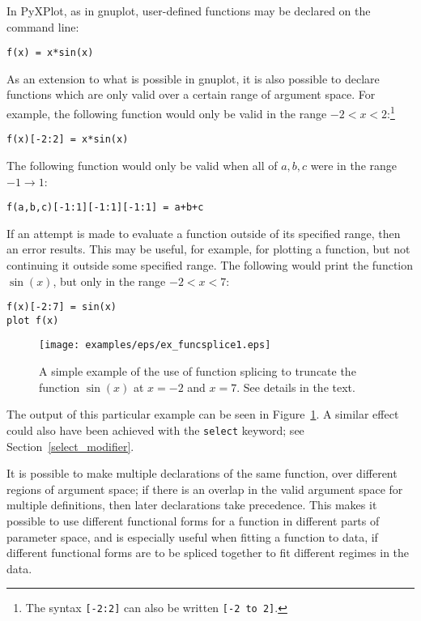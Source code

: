 \documentclass[a4paper,onecolumn,11pt]{book}
\begin{document}
In PyXPlot, as in gnuplot, user-defined functions may be declared on the
command line:

\begin{verbatim}
f(x) = x*sin(x)
\end{verbatim}

\noindent As an extension to what is possible in gnuplot, it is also possible
to declare functions which are only valid over a certain range of argument
space. For example, the following function would only be valid in the range
$-2<x<2$:\footnote{The syntax \texttt{[-2:2]} can also be written \texttt{[-2
to 2]}.}

\begin{verbatim}
f(x)[-2:2] = x*sin(x)
\end{verbatim}

\noindent The following function would only be valid when all of ${a,b,c}$ were
in the range $-1 \to 1$:

\begin{verbatim}
f(a,b,c)[-1:1][-1:1][-1:1] = a+b+c
\end{verbatim}

If an attempt is made to evaluate a function outside of its specified range,
then an error results. This may be useful, for example, for plotting a
function, but not continuing it outside some specified range. The following
would print the function $\sin(x)$, but only in the range $-2<x<7$:

\begin{verbatim}
f(x)[-2:7] = sin(x)
plot f(x)
\end{verbatim}

\begin{figure}
\begin{center}
\texttt{[image: examples/eps/ex\_funcsplice1.eps]}
\end{center}
\caption{A simple example of the use of function splicing to truncate the function $\sin(x)$ at $x=-2$ and $x=7$. See details in the text.}
\label{fig:ex_funcsplice1}
\end{figure}

\label{splice} \noindent The output of this particular example can be seen in
Figure~\ref{fig:ex_funcsplice1}. A similar effect could also have been achieved
with the \texttt{select} keyword; see Section~\ref{select_modifier}.

It is possible to make multiple declarations of the same function, over
different regions of argument space; if there is an overlap in the valid
argument space for multiple definitions, then later declarations take
precedence. This makes it possible to use different functional forms for a
function in different parts of parameter space, and is especially useful when
fitting a function to data, if different functional forms are to be spliced
together to fit different regimes in the data.
\end{document}
